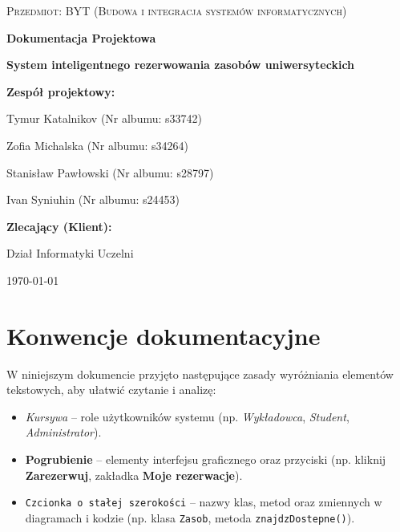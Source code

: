 \documentclass[11pt, a4paper]{article}
\begin{document}
\begin{titlepage}
    \centering
    \vspace*{2cm}
    
    {\scshape\Large Przedmiot: BYT (Budowa i integracja systemów informatycznych) \par}
    \vspace{1.5cm}
    
    {\Huge\bfseries Dokumentacja Projektowa\par}
    \vspace{0.5cm}
    {\Large\bfseries System inteligentnego rezerwowania zasobów uniwersyteckich\par}
    
    \vspace{2cm}
    
    {\Large \textbf{Zespół projektowy:}\par}
    \vspace{0.5cm}
    {\large
        Tymur Katalnikov (Nr albumu: s33742) \par
        Zofia Michalska  (Nr albumu: s34264) \par
        Stanisław Pawłowski (Nr albumu: s28797) \par
        Ivan Syniuhin (Nr albumu: s24453) \par
    }
    
    \vspace{2cm}
    {\large \textbf{Zlecający (Klient):} \par}
    {\large Dział Informatyki Uczelni \par}
    
    \vfill
    
    {\large \today\par}
\end{titlepage}

\tableofcontents
\newpage

\section{Konwencje dokumentacyjne}
W niniejszym dokumencie przyjęto następujące zasady wyróżniania elementów tekstowych, aby ułatwić czytanie i analizę:
\begin{itemize}
    \item \textit{Kursywa} -- role użytkowników systemu (np. \textit{Wykładowca}, \textit{Student}, \textit{Administrator}).
    \item \textbf{Pogrubienie} -- elementy interfejsu graficznego oraz przyciski (np. kliknij \textbf{Zarezerwuj}, zakładka \textbf{Moje rezerwacje}).
    \item \texttt{Czcionka o stałej szerokości} -- nazwy klas, metod oraz zmiennych w diagramach i kodzie (np. klasa \texttt{Zasob}, metoda \texttt{znajdzDostepne()}).
\end{itemize}
\end{document}
